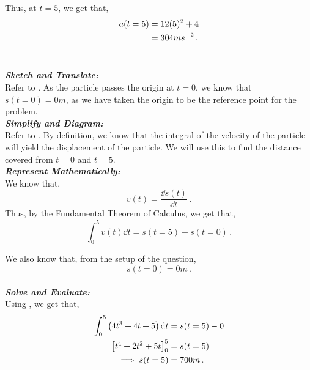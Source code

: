 \begin{subquestions}
\begin{subsubquestions}
Thus, at $t=5$, we get that,
\begin{align}
	a(t=5) & = 12(5)^2 + 4 \nonumber \\
	       & = 304 ms^{-2} \,.
\end{align}\\


\subsubquestion

\textbf{\textit{Sketch and Translate:}} \\
Refer to . As the particle passes the origin at $t=0$, we know that $s(t=0) = 0m$, as we have taken the origin to be the reference point for the problem. \\




\textbf{\textit{Simplify and Diagram:}} \\
Refer to . By definition, we know that the integral of the velocity of the particle will yield the displacement of the particle. We will use this to find the distance covered from $t=0$ and $t=5$. \\ 




\textbf{\textit{Represent Mathematically:}} \\ 
We know that,
\begin{equation}
	v(t)=\frac{\dd s(t)}{\dd t} \,.
\end{equation}
Thus, by the Fundamental Theorem of Calculus, we get that,
\begin{equation}
	\int_{0}^{5} v(t) \dd t = s(t=5)-s(t=0) \label{2005:q5:FTC1} \,.
\end{equation}

We also know that, from the setup of the question,
\begin{equation}
	s(t=0) = 0m \,.
\end{equation}\\




\textbf{\textit{Solve and Evaluate:}} \\ 
Using , we get that,
\begin{align}
	\int_{0}^{5} \left(4t^3+4t+5\right) \mathrm{d} t & = s(t=5)-0 \nonumber \\
	\left[t^4+2t^2+5t\right]^5_0 & = s(t=5) \nonumber \\
	\implies s(t=5) & = 700m \,.
\end{align}\\


\end{subsubquestions}
\end{subquestions}

